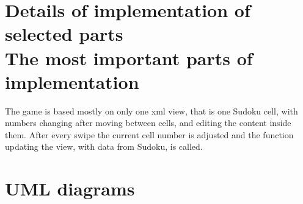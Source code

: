 \documentclass[a4paper,twoside,12pt]{book}
\begin{document}
\section {Details of implementation of selected parts\\ {\large The most important parts of implementation}}

\par The game is based mostly on only one xml view, that is one Sudoku cell, with numbers changing after moving between cells, and editing the content inside them. After every swipe the current cell number is adjusted and the function updating the view, with data from Sudoku, is called.



\section {UML diagrams}
\end{document}
